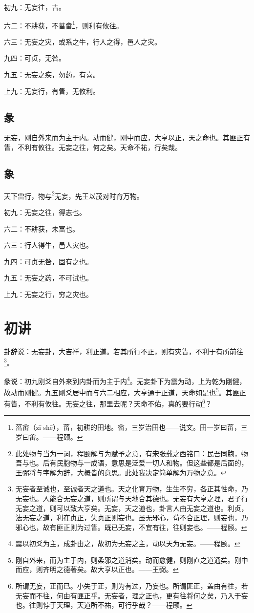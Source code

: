 \documentclass[12pt,oneside]{book}
\begin{document}
初九：无妄往，吉。

六二：不耕获，不菑畲\footnote{菑畲（zī shē），菑，初耕的田地。畲，三岁治田也——说文。田一岁曰菑，三岁曰畬。——程颐。}，则利有攸往。

六三：无妄之灾，或系之牛，行人之得，邑人之灾。

九四：可贞，无咎。

九五：无妄之疾，勿药，有喜。

上九：无妄行，有眚，无攸利。

\subsection{彖}
无妄，刚自外来而为主于内。动而健，刚中而应，大亨以正，天之命也。其匪正有眚，不利有攸往。无妄之往，何之矣。天命不祐，行矣哉。

\subsection{象}
天下雷行，物与\footnote{此处物与当为一词，程颐解与为赋予之意，有宋张载之西铭曰：民吾同胞，物吾与也。后有民胞物与一成语，意思是泛爱一切人和物。但这些都是后面的，王弼将与字解为辞，大概皆的意思。此处我决定简单解为万物之意。}无妄，先王以茂对时育万物。

初九：无妄之往，得志也。

六二：不耕获，未富也。

六三：行人得牛，邑人灾也。

九四：可贞无咎，固有之也。

九五：无妄之药，不可试也。

上九：无妄之行，穷之灾也。

\section{初讲}
卦辞说：无妄卦，大吉祥，利正道。若其所行不正，则有灾眚，不利于有所前往\footnote{无妄者至诚也，至诚者天之道也。天之化育万物，生生不穷，各正其性命，乃无妄也。人能合无妄之道，则所谓与天地合其德也。无妄有大亨之理，君子行无妄之道，则可以致大亨矣。无妄，天之道也，卦言人由无妄之道也。利贞，法无妄之道，利在贞正，失贞正则妄也。虽无邪心，苟不合正理，则妄也，乃邪心也，故有匪正则为过眚。既已无妄，不宜有往，往则妄也。——程颐。}。

彖说：初九刚爻自外来到内卦而为主于内\footnote{震以初爻为主，成卦由之，故初为无妄之主，动以天为无妄。——程颐。}。无妄卦下为震为动，上为乾为刚健，故动而刚健。九五刚爻居中而与六二相应，大亨通于正道，天命如是也\footnote{刚自外来，而为主于内，则柔邪之道消矣。动而愈健，则刚直之道通矣。刚中而应，则齐明之德著矣。故大亨以正也。——王弼。}。其匪正有眚，不利有攸往。无妄之往，那里去呢？天命不佑，真的要行动\footnote{所谓无妄，正而已。小失于正，则为有过，乃妄也。所谓匪正，盖由有往，若无妄而不往，何由有匪正乎。无妄者，理之正也，更有往将何之矣，乃入于妄也。往则悖于天理，天道所不祐，可行乎哉？——程颐。}？
\end{document}
